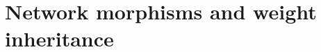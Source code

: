 \renewcommand{\lecturetitle}{Network morphisms and weight inheritance}
\renewcommand{\lecturetime}{Week 9, Video 6}
\section{\lecturetitle}

